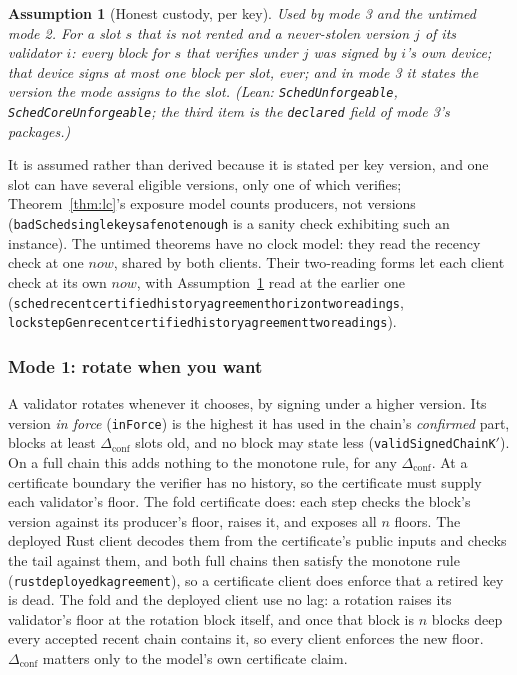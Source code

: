 \documentclass[10pt]{article}
\newtheorem{assumption}{Assumption}
\DeclareRobustCommand{\code}[1]{{\renewcommand{\_}{\textunderscore\allowbreak}\texttt{#1}}}
\begin{document}
\begin{assumption}[Honest custody, per key]\label{ass:rotation-honest}
Used by mode 3 and the untimed mode 2. For a slot $s$ that is not rented
and a never-stolen version $j$ of its validator $i$: every block for $s$
that verifies under $j$ was signed by $i$'s own device; that device signs
at most one block per slot, ever; and in mode 3 it states the version the
mode assigns to the slot.
\quad\textit{(Lean: \code{SchedUnforgeable}, \code{SchedCoreUnforgeable};
the third item is the \code{declared} field of mode 3's packages.)}
\end{assumption}

It is assumed rather than derived because it is stated per key version,
and one slot can have several eligible versions, only one of which
verifies; Theorem~\ref{thm:lc}'s exposure model counts producers, not
versions (\code{badSched\_single\_key\_safe\_not\_enough} is a sanity
check exhibiting such an instance). The untimed theorems have no clock
model: they read the recency check at one $\mathit{now}$, shared by both
clients. Their two-reading forms let each client check at its own
$\mathit{now}$, with Assumption~\ref{ass:rotation-honest} read at the
earlier one
(\code{sched\_recent\_certified\_history\_agreement\_horizon\_two\_readings},
\code{lockstepGen\_recent\_certified\_history\_agreement\_two\_readings}).

\subsubsection*{Mode 1: rotate when you want}

A validator rotates whenever it chooses, by signing under a higher
version. Its version \emph{in force} (\code{inForce}) is the highest it
has used in the chain's \emph{confirmed} part, blocks at least
$\Delta_{\mathrm{conf}}$ slots old, and no block may state less
(\code{validSignedChainK$'$}). On a full chain this adds nothing to the
monotone rule, for any $\Delta_{\mathrm{conf}}$. At a certificate
boundary the verifier has no history, so the certificate must supply
each validator's floor. The fold certificate does: each step checks the
block's version against its producer's floor, raises it, and exposes all
$n$ floors. The deployed Rust client decodes them from the
certificate's public inputs and checks the tail against them, and both
full chains then satisfy the monotone rule
(\code{rust\_deployed\_k\_agreement}), so a certificate client does
enforce that a retired key is dead. The fold and the deployed client
use no lag: a rotation raises its validator's floor at the rotation
block itself, and once that block is $n$ blocks deep every accepted
recent chain contains it, so every client enforces the new floor.
$\Delta_{\mathrm{conf}}$ matters only to the model's own certificate claim.
\end{document}
